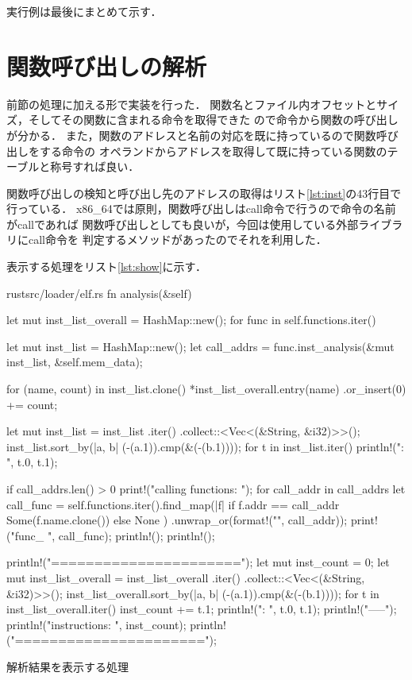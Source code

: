 \documentclass[12pt,a4paper,dvipdfmx]{jsarticle}
\begin{document}
実行例は最後にまとめて示す．

\section{関数呼び出しの解析}
前節の処理に加える形で実装を行った．
関数名とファイル内オフセットとサイズ，そしてその関数に含まれる命令を取得できた
ので命令から関数の呼び出しが分かる．
また，関数のアドレスと名前の対応を既に持っているので関数呼び出しをする命令の
オペランドからアドレスを取得して既に持っている関数のテーブルと称号すれば良い．

関数呼び出しの検知と呼び出し先のアドレスの取得はリスト\ref{lst:inst}の43行目で
行っている．
x86\_64では原則，関数呼び出しはcall命令で行うので命令の名前がcallであれば
関数呼び出しとしても良いが，今回は使用している外部ライブラリにcall命令を
判定するメソッドがあったのでそれを利用した．

表示する処理をリスト\ref{lst:show}に示す．
\begin{longlisting}
\begin{myminted}{rust}{src/loader/elf.rs}
fn analysis(&self) {
    let mut inst_list_overall = HashMap::new();
    for func in self.functions.iter() {
        let mut inst_list = HashMap::new();
        let call_addrs = func.inst_analysis(&mut inst_list, &self.mem_data);

        for (name, count) in inst_list.clone() {
            *inst_list_overall.entry(name)
                .or_insert(0) += count;
        }

        let mut inst_list = inst_list
            .iter()
            .collect::<Vec<(&String, &i32)>>();
        inst_list.sort_by(|a, b| (-(a.1)).cmp(&(-(b.1))));
        for t in inst_list.iter() {
            println!("{}: {}", t.0, t.1);
        }

        if call_addrs.len() > 0 {
            print!("calling functions: ");
            for call_addr in call_addrs {
                let call_func = self.functions.iter().find_map(|f| {
                    if f.addr == call_addr {
                        Some(f.name.clone())
                    } else {
                        None
                    }
                })
                .unwrap_or(format!("{}", call_addr));
                print!("func_{} ", call_func);
            }
            println!();
        }
        println!();
    }

    println!("======================");
    let mut inst_count = 0;
    let mut inst_list_overall = inst_list_overall
        .iter()
        .collect::<Vec<(&String, &i32)>>();
    inst_list_overall.sort_by(|a, b| (-(a.1)).cmp(&(-(b.1))));
    for t in inst_list_overall.iter() {
        inst_count += t.1;
        println!("{}: {}", t.0, t.1);
    }
    println!("-----");
    println!("instructions: {}", inst_count);
    println!("======================");
}
\end{myminted}
\caption{解析結果を表示する処理}
\label{lst:show}
\end{longlisting}
\end{document}
